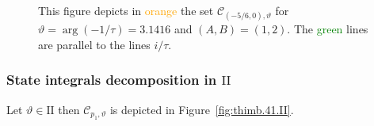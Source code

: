 \documentclass[12pt,reqno]{amsart}
\theoremstyle{definition}
\def\calC{\mathcal C}
\renewcommand{\=}{\;=\;}
\begin{document}
\begin{figure}[ht]
\begin{tiny}
\end{tiny}
\caption{This figure depicts in \textcolor{orange}{orange} the set $\calC_{(-5/6,0),\vartheta}$ for $\vartheta=\arg(-1/\tau)=3.1416$ and $(A,B)=(1,2)$. The \textcolor{green}{green} lines are parallel to the lines $i/\tau$.}\label{fig:thimb.41.saddleI.II}
\end{figure}

\subsubsection{State integrals decomposition in $\mathrm{II}$}
Let $\vartheta\in\mathrm{II}$ then $\calC_{p_1,\vartheta}$ is depicted in Figure~\ref{fig:thimb.41.II}.
\end{document}

